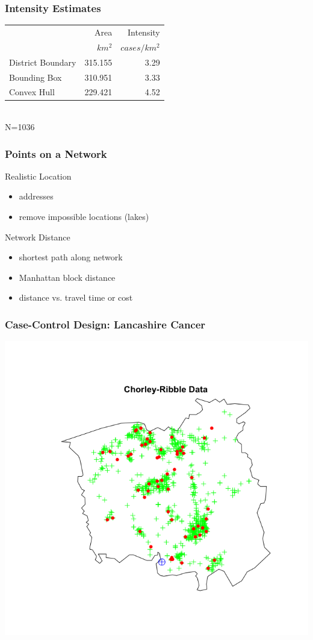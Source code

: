 \documentclass[nototal]{beamer}
\begin{document}
     \begin{frame}
       \frametitle{Intensity Estimates}
       \begin{center}
       \begin{tabular}[h]{lrr}
       & Area& Intensity\\
       & $km^2$& $cases/km^2$\\
       \hline
       District Boundary& 315.155& 3.29\\
       Bounding Box&310.951 &3.33\\
       Convex Hull&229.421 &4.52\\
       \hline
       \end{tabular}\\

       \vspace{0.5in}
       N=1036
     \end{center}
      \end{frame}

      \begin{frame}
	\frametitle{Points on a Network}
	\begin{block}{Realistic Location}
	  \begin{itemize}
	    \item addresses
	    \item remove impossible locations (lakes)
	  \end{itemize}
	 \end{block}
       \begin{block}{Network Distance}
	  \begin{itemize}
	    \item shortest path along network
	    \item Manhattan block distance
	    \item distance vs. travel time or cost
	  \end{itemize}
	 \end{block}
	\end{frame}


	 \begin{frame}
	   \frametitle{Case-Control Design: Lancashire Cancer}
	   \begin{center}
	     \includegraphics[width=.65\linewidth]{chorleyincin.png}
	   \end{center}
	 \end{frame}
\end{document}
